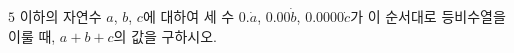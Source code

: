 $5$ 이하의 자연수 $a$, $b$, $c$에 대하여 세 수 $0.\dot{a}$, $0.00\dot{b}$, $0.0000\dot{c}$가 이 순서대로 등비수열을 이룰 때, $a+b+c$의 값을 구하시오. 
